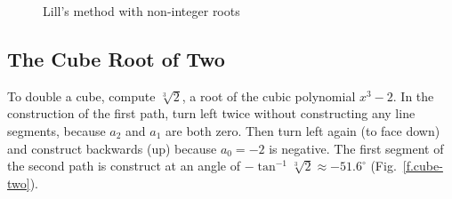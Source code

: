 \begin{figure}[t]
\begin{center}
\end{center}
\caption{Lill's method with non-integer roots}\label{f.noninteger}
\end{figure}

\newpage

\subsection{The Cube Root of Two}\label{s.cube}
To double a cube, compute $\sqrt[3]{2}$, a root of the cubic polynomial $x^3-2$. In the construction of the first path, turn left twice without constructing any line segments, because $a_2$ and $a_1$ are both zero. Then turn left again (to face down) and construct backwards (up) because $a_0=-2$ is negative. The first segment of the second path is construct at an angle of $-\tan^{-1} \sqrt[3]{2}\approx -51.6^\circ$ (Fig.~\ref{f.cube-two}).

